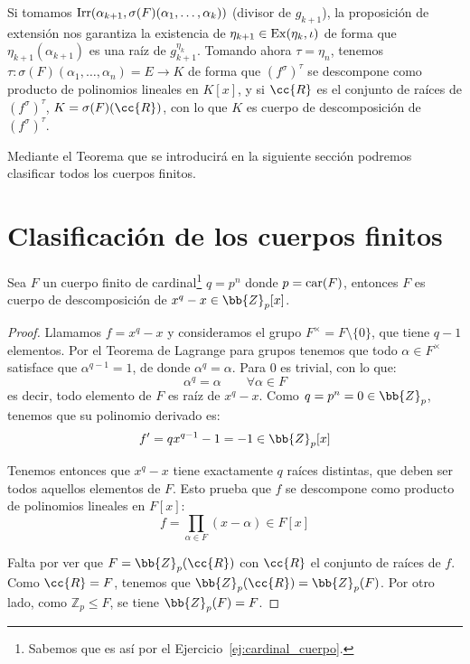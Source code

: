 \begin{ejercicio}
\begin{figure}[H]
    \end{figure}
    Si tomamos $\operatorname{Irr}(\alpha_{k+1},\sigma(F)(\alpha_1, \ldots, \alpha_k))$ (divisor de $g_{k+1}$), la proposición de extensión nos garantiza la existencia de $\eta_{k+1}\in \operatorname{Ex}(\eta_k,\iota)$ de forma que $\eta_{k+1}(\alpha_{k+1})$ es una raíz de $g_{k+1}^{\eta_k}$. Tomando ahora $\tau = \eta_{n}$, tenemos $\tau:\sigma(F)(\alpha_1, \ldots, \alpha_n) = E\to K$ de forma que ${(f^{\sigma})}^{\tau}$ se descompone como producto de polinomios lineales en $K[x]$, y si $\cc{R}$ es el conjunto de raíces de ${(f^{\sigma})}^{\tau}$, $K = \sigma(F)(\cc{R})$, con lo que $K$ es cuerpo de descomposición de ${(f^{\sigma})}^{\tau}$.
\end{ejercicio}

Mediante el Teorema que se introducirá en la siguiente sección podremos clasificar todos los cuerpos finitos.
\section{Clasificación de los cuerpos finitos}\label{sec:clasificacion_cuerpos_finitos}
\begin{prop}\label{prop:cuerpo_descomposicion}
    Sea $F$ un cuerpo finito de cardinal\footnote{Sabemos que es así por el Ejercicio~\ref{ej:cardinal_cuerpo}.} $q=p^n$  donde $p=\operatorname{car}(F)$, entonces $F$ es cuerpo de descomposición de $x^q-x\in \bb{Z}_p[x]$.
    \begin{proof}
        Llamamos $f=x^q-x$ y consideramos el grupo $F^{\times} = F\setminus\{0\}$, que tiene $q-1$ elementos. Por el Teorema de Lagrange para grupos tenemos que todo $\alpha\in F^{\times}$ satisface que $\alpha^{q-1}=1$, de donde $\alpha^q = \alpha$. Para $0$ es trivial, con lo que:
        \begin{equation*}
            \alpha^q = \alpha \qquad \forall \alpha\in F
        \end{equation*}
        es decir, todo elemento de $F$ es raíz de $x^q-x$. Como $q=p^n=0\in \bb{Z}_p$, tenemos que su polinomio derivado es:
        \begin{equation*}
            f' = qx^{q-1}-1 = -1\in \bb{Z}_p[x]
        \end{equation*}
        
        Tenemos entonces que $x^q-x$ tiene exactamente $q$ raíces distintas, que deben ser todos aquellos elementos de $F$. Esto prueba que $f$ se descompone como producto de polinomios lineales en $F[x]$:
        \begin{equation*}
            f = \prod_{\alpha\in F} (x-\alpha) \in F[x]
        \end{equation*}
        
        Falta por ver que $F=\bb{Z}_p(\cc{R})$ con $\cc{R}$ el conjunto de raíces de $f$. Como $\cc{R} = F$, tenemos que $\bb{Z}_p(\cc{R}) = \bb{Z}_p(F)$. Por otro lado, como $\mathbb{Z}_p\leq F$, se tiene $\bb{Z}_p(F) = F$.
    \end{proof}
\end{prop}

